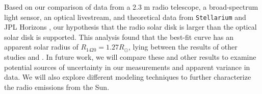 Based on our comparison of data from a 2.3 m radio telescope, a broad-spectrum light sensor, an optical livestream, and theoretical data from \texttt{Stellarium}\cite{zotti_simulated_2020} and JPL Horizons \cite{nasa_jpl_solar_system_dynamics_group_jpl_nodate}, our hypothesis that the radio solar disk is larger than the optical solar disk is supported.
This analysis found that the best-fit curve has an apparent solar radius of $R_{\mathrm{1420}} = 1.27 R_{\odot}$, lying between the results of other studies \cite{messerotti_radio_2000} and \cite{leung_solar_2022}.
In future work, we will compare these and other results to examine potential sources of uncertainty in our measurements and apparent variance in data.
We will also explore different modeling techniques to further characterize the radio emissions from the Sun.